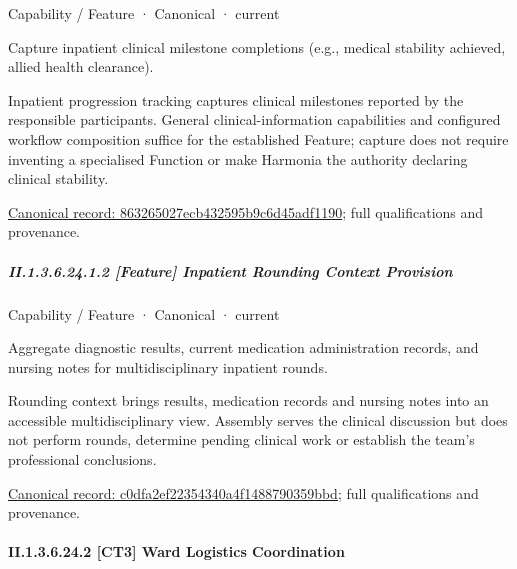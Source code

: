 \label{element:863265027ecb432595b9c6d45adf1190}
{\small Capability / Feature · Canonical · current}\par

Capture inpatient clinical milestone completions (e.g., medical stability achieved, allied health clearance).



Inpatient progression tracking captures clinical milestones reported by the responsible participants. General clinical-information capabilities and configured workflow composition suffice for the established Feature; capture does not require inventing a specialised Function or make Harmonia the authority declaring clinical stability.


{\footnotesize \href{../../../../../../../continuum/strategy/capability/feature/863265027ecb432595b9c6d45adf1190.md}{Canonical record: 863265027ecb432595b9c6d45adf1190}; full qualifications and provenance.}\par
\subparagraph*{II.1.3.6.24.1.2 [Feature] Inpatient Rounding Context Provision}
\label{navigation:II.1.3.6.24.1.2}

\label{element:c0dfa2ef22354340a4f1488790359bbd}
{\small Capability / Feature · Canonical · current}\par

Aggregate diagnostic results, current medication administration records, and nursing notes for multidisciplinary inpatient rounds.



Rounding context brings results, medication records and nursing notes into an accessible multidisciplinary view. Assembly serves the clinical discussion but does not perform rounds, determine pending clinical work or establish the team's professional conclusions.


{\footnotesize \href{../../../../../../../continuum/strategy/capability/feature/c0dfa2ef22354340a4f1488790359bbd.md}{Canonical record: c0dfa2ef22354340a4f1488790359bbd}; full qualifications and provenance.}\par
\paragraph*{II.1.3.6.24.2 [CT3] Ward Logistics Coordination}
\label{navigation:II.1.3.6.24.2}

